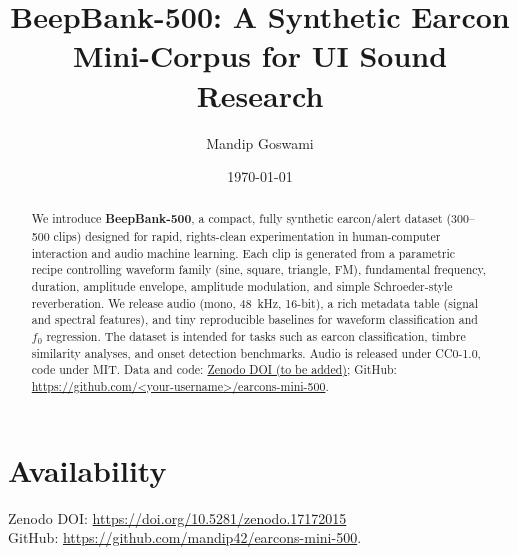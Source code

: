 \documentclass[11pt]{article}
\title{BeepBank-500: A Synthetic Earcon Mini-Corpus for UI Sound Research}
\author{Mandip Goswami}
\date{\today}
\begin{document}
\maketitle

\begin{abstract}
We introduce \textbf{BeepBank-500}, a compact, fully synthetic earcon/alert dataset (300--500 clips) designed for rapid, rights-clean experimentation in human-computer interaction and audio machine learning. Each clip is generated from a parametric recipe controlling waveform family (sine, square, triangle, FM), fundamental frequency, duration, amplitude envelope, amplitude modulation, and simple Schroeder-style reverberation. We release audio (mono, 48~kHz, 16-bit), a rich metadata table (signal and spectral features), and tiny reproducible baselines for waveform classification and $f_0$ regression. The dataset is intended for tasks such as earcon classification, timbre similarity analyses, and onset detection benchmarks. Audio is released under CC0-1.0, code under MIT. Data and code: \href{https://doi.org/10.5281/zenodo.XXXXXXX}{Zenodo DOI (to be added)}; GitHub: \url{https://github.com/<your-username>/earcons-mini-500}.
\end{abstract}


\section{Availability}
Zenodo DOI: \url{https://doi.org/10.5281/zenodo.17172015} \\
GitHub: \url{https://github.com/mandip42/earcons-mini-500}.
\end{document}
